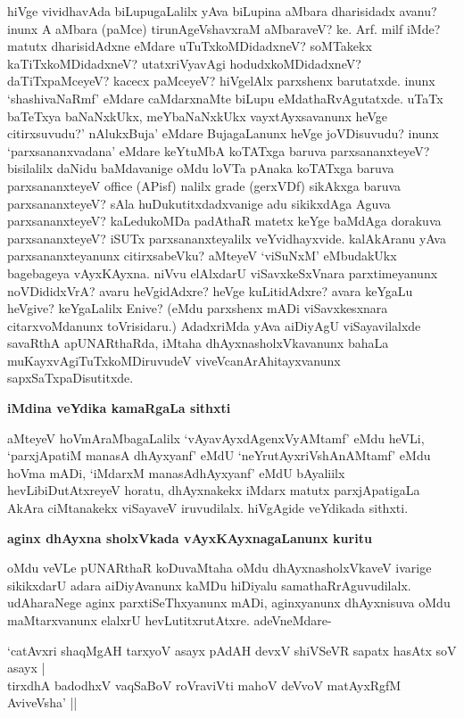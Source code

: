 hiVge vividhavAda biLupugaLalilx yAva biLupina aMbara dharisidadx avanu? inunx A aMbara (paMce) tirunAgeVshavxraM aMbaraveV? ke. Arf. milf iMde? matutx dharisidAdxne eMdare uTuTxkoMDidadxneV? soMTakekx kaTiTxkoMDidadxneV? utatxriVyavAgi hodudxkoMDidadxneV? daTiTxpaMceyeV? kacecx paMceyeV? hiVgelAlx parxshenx barutatxde. inunx `shashivaNaRmf' eMdare caMdarxnaMte biLupu eMdathaRvAgutatxde. uTaTx baTeTxya baNaNxkUkx, meYbaNaNxkUkx vayxtAyxsavanunx heVge citirxsuvudu?' nAlukxBuja' eMdare BujagaLanunx heVge joVDisuvudu? inunx `parxsananxvadana' eMdare keYtuMbA koTATxga baruva parxsananxteyeV? bisilalilx daNidu baMdavanige oMdu loVTa pAnaka koTATxga baruva parxsananxteyeV {\rm office} (APisf) nalilx {\rm grade} (gerxVDf) sikAkxga baruva parxsananxteyeV? sAla huDukutitxdadxvanige adu sikikxdAga Aguva parxsananxteyeV? kaLedukoMDa padAthaR matetx keYge baMdAga dorakuva parxsananxteyeV? iSUTx parxsananxteyalilx veYvidhayxvide. kalAkAranu yAva parxsananxteyanunx citirxsabeVku? aMteyeV `viSuNxM' eMbudakUkx bagebageya vAyxKAyxna. niVvu elAlxdarU viSavxkeSxVnara parxtimeyanunx noVDididxVrA? avaru heVgidAdxre? heVge kuLitidAdxre? avara keYgaLu heVgive? keYgaLalilx Enive? (eMdu parxshenx mADi viSavxkesxnara citarxvoMdanunx toVrisidaru.) AdadxriMda yAva aiDiyAgU viSayavilalxde savaRthA apUNARthaRda, iMtaha dhAyxnasholxVkavanunx bahaLa muKayxvAgiTuTxkoMDiruvudeV viveVcanArAhitayxvanunx sapxSaTxpaDisutitxde.

{\bf iMdina veYdika kamaRgaLa sithxti}

aMteyeV hoVmAraMbagaLalilx `vAyavAyxdAgenxVyAMtamf' eMdu heVLi, `parxjApatiM manasA dhAyxyanf' eMdU `neYrutAyxriVshAnAMtamf' eMdu hoVma mADi, `iMdarxM manasAdhAyxyanf' eMdU bAyaliilx hevLibiDutAtxreyeV horatu, dhAyxnakekx iMdarx matutx parxjApatigaLa AkAra ciMtanakekx viSayaveV iruvudilalx. hiVgAgide veYdikada sithxti.

{\bf aginx dhAyxna sholxVkada vAyxKAyxnagaLanunx kuritu}

oMdu veVLe pUNARthaR koDuvaMtaha oMdu dhAyxnasholxVkaveV ivarige sikikxdarU adara aiDiyAvanunx kaMDu hiDiyalu samathaRrAguvudilalx. udAharaNege aginx parxtiSeThxyanunx mADi, aginxyanunx dhAyxnisuva oMdu maMtarxvanunx elalxrU hevLutitxrutAtxre. adeVneMdare-

\begin{shloka}
`catAvxri shaqMgAH tarxyoV asayx pAdAH devxV shiVSeVR sapatx hasAtx soV asayx |\\
tirxdhA badodhxV vaqSaBoV roVraviVti mahoV deVvoV matAyxRgfM AviveVsha' ||
\end{shloka}

